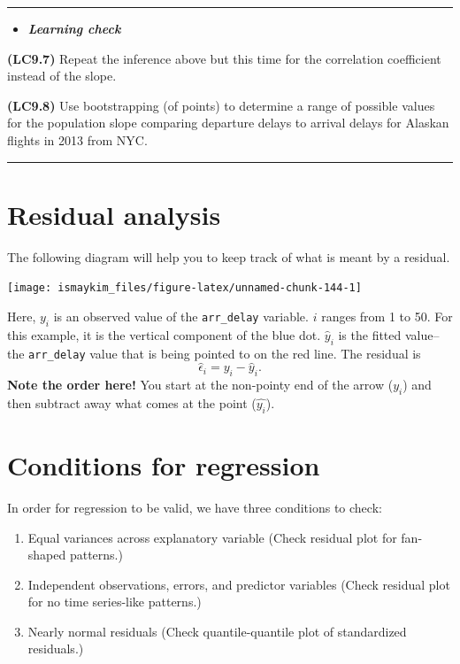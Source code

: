 \documentclass[]{tufte-book}
\let\oldrule=\rule
\renewcommand{\rule}[1]{\oldrule{\linewidth}}
\providecommand{\tightlist}{%
  \setlength{\itemsep}{0pt}\setlength{\parskip}{0pt}}
\newenvironment{rmdblock}[1]
  {\begin{shaded*}
  \begin{itemize}
  \renewcommand{\labelitemi}{
    \raisebox{-.7\height}[0pt][0pt]{
    }
  }
  \item
  }
  {
  \end{itemize}
  \end{shaded*}
  }
\newenvironment{learncheck}
  {\begin{rmdblock}{warning}}
  {\end{rmdblock}}
\begin{document}
\begin{center}\rule{0.5\linewidth}{\linethickness}\end{center}

\begin{learncheck}
\textbf{\emph{Learning check}}
\end{learncheck}

\textbf{(LC9.7)} Repeat the inference above but this time for the
correlation coefficient instead of the slope.

\textbf{(LC9.8)} Use bootstrapping (of points) to determine a range of
possible values for the population slope comparing departure delays to
arrival delays for Alaskan flights in 2013 from NYC.

\begin{center}\rule{0.5\linewidth}{\linethickness}\end{center}

\section{Residual analysis}\label{resid}

The following diagram will help you to keep track of what is meant by a
residual.

\begin{center}\texttt{[image: ismaykim\_files/figure-latex/unnamed-chunk-144-1]} \end{center}

Here, \(y_i\) is an observed value of the \texttt{arr\_delay} variable.
\(i\) ranges from 1 to 50. For this example, it is the vertical
component of the blue dot. \(\hat{y}_i\) is the fitted value--the
\texttt{arr\_delay} value that is being pointed to on the red line. The
residual is \[\hat{\epsilon}_i = y_i - \hat{y}_i.\] \textbf{Note the
order here!} You start at the non-pointy end of the arrow (\(y_i\)) and
then subtract away what comes at the point (\(\hat{y_i}\)).

\section{Conditions for regression}\label{conditions-for-regression}

In order for regression to be valid, we have three conditions to check:

\begin{enumerate}
\def\labelenumi{\arabic{enumi}.}
\tightlist
\item
  Equal variances across explanatory variable (Check residual plot for
  fan-shaped patterns.)
\item
  Independent observations, errors, and predictor variables (Check
  residual plot for no time series-like patterns.)
\item
  Nearly normal residuals (Check quantile-quantile plot of standardized
  residuals.)
\end{enumerate}
\end{document}
